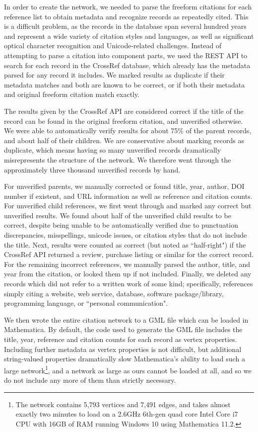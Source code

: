 \documentclass[12pt]{thesis}
\theoremstyle{plain}
\theoremstyle{definition}
\theoremstyle{remark}
\begin{document}
In order to create the network, we needed to parse the freeform citations for each reference list to obtain metadata and recognize records as repeatedly cited. This is a difficult problem, as the records in the database span several hundred years and represent a wide variety of citation styles and languages, as well as significant optical character recognition and Unicode-related challenges. Instead of attempting to parse a citation into component parts, we used the REST API to search for each record in the CrossRef database, which already has the metadata parsed for any record it includes. We marked results as duplicate if their metadata matches and both are known to be correct, or if both their metadata and original freeform citation match exactly. 

The results given by the CrossRef API are considered correct if the title of the record can be found in the original freeform citation, and unverified otherwise. We were able to automatically verify results for about 75\% of the parent records, and about half of their children. We are conservative about marking records as duplicate, which means having so many unverified records dramatically misrepresents the structure of the network. We therefore went through the approximately three thousand unverified records by hand.

For unverified parents, we manually corrected or found title, year, author, DOI number if existent, and URL information as well as reference and citation counts. For unverified child references, we first went through and marked any correct but unverified results. We found about half of the unverified child results to be correct, despite being unable to be automatically verified due to punctuation discrepancies, misspellings, unicode issues, or citation styles that do not include the title. Next, results were counted as correct (but noted as ``half-right") if the CrossRef API returned a review, purchase listing or similar for the correct record. For the remaining incorrect references, we manually parsed the author, title, and year from the citation, or looked them up if not included. Finally, we deleted any records which did not refer to a written work of some kind; specifically, references simply citing a website, web service, database, software package/library, programming language, or ``personal communication".

We then wrote the entire citation network to a GML file which can be loaded in Mathematica. By default, the code used to generate the GML file includes the title, year, reference and citation counts for each record as vertex properties. Including further metadata as vertex properties is not difficult, but additional string-valued properties dramatically slow Mathematica's ability to load such a large network\footnote{The network contains 5,793 vertices and 7,491 edges, and takes almost exactly two minutes to load on a 2.6GHz 6th-gen quad core Intel Core i7 CPU with 16GB of RAM running Windows 10 using Mathematica 11.2.}, and a network as large as ours cannot be loaded at all, and so we do not include any more of them than strictly necessary.
\end{document}
